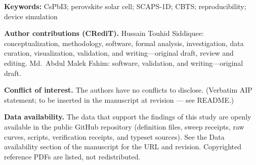 \documentclass[11pt,a4paper]{article}
\begin{document}
\vspace{1em}
\noindent\textbf{Keywords:} CsPbI3; perovskite solar cell; SCAPS-1D; CBTS; reproducibility; device simulation

\vspace{1em}
\noindent\textbf{Author contributions (CRediT).} Hussain Touhid Siddiquee: conceptualization, methodology, software, formal analysis, investigation, data curation, visualization, validation, and writing---original draft, review and editing. Md.\ Abdul Malek Fahim: software, validation, and writing---original draft.

\vspace{1em}
\noindent\textbf{Conflict of interest.} The authors have no conflicts to disclose. (Verbatim AIP statement; to be inserted in the manuscript at revision --- see README.)

\vspace{1em}
\noindent\textbf{Data availability.} The data that support the findings of this study are openly available in the public GitHub repository (definition files, sweep receipts, raw curves, scripts, verification receipts, and typeset sources). See the Data availability section of the manuscript for the URL and revision. Copyrighted reference PDFs are listed, not redistributed.
\end{document}
